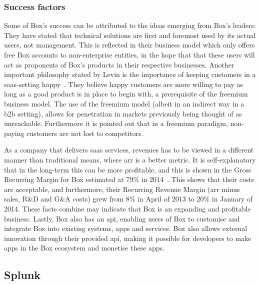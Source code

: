 \subsubsection{Success factors}
Some of Box's success can be attributed to the ideas emerging from Box's leaders: They have stated that technical solutions are first and foremost used by its actual users, not management. This is reflected in their business model which only offers free Box accounts to non-enterprise entities, in the hope that that these users will act as proponents of Box's products in their respective businesses. Another important philosophy stated by Levin is the importance of keeping customers in a \gls{saas}-setting happy~\cite{tientzuozuora2014}\cite{youtube2011}. They believe happy customers are more willing to pay as long as a good product is in place to begin with, a prerequisite of the freemium business model. The use of the freemium model (albeit in an indirect way in a \gls{b2b} setting), allows for penetration in markets previously being thought of as unreachable. Furthermore it is pointed out that in a freemium paradigm, non-paying customers are not lost to competitors.


As a company that delivers \gls{saas} services, revenues has to be viewed in a different manner than traditional means, where \gls{arr} is a better metric. It is self-explanatory that in the long-term this can be more profitable, and this is shown in the Gross Recurring Margin for Box estimated at 79\% in 2014~\cite{tientzuozuora2014}. This shows that their costs are acceptable, and furthermore, their Recurring Revenue Margin (\gls{arr} minus sales, R\&D and G\&A costs) grew from 8\% in April of 2013 to 20\% in January of 2014. These facts combine may indicate that Box is an expanding and profitable business. Lastly, Box also has an \gls{api}, enabling users of Box to customise and integrate Box into existing systems, apps and services. Box also allows external innovation through their provided \gls{api}, making it possible for developers to make apps in the Box ecosystem and monetise these apps. 

\subsection{Splunk}
